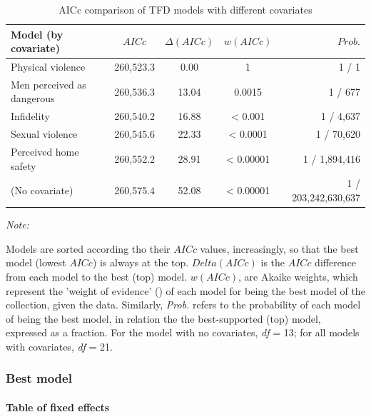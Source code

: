 \documentclass[
  bookmarksnumbered]{article}
\begin{document}
\begin{table}[H]
\centering
\caption{\label{tab:comp-m2}AICc comparison of TFD models with different covariates}
\centering
\begin{threeparttable}
\begin{tabular}[t]{lcccr}
\toprule
Model (by covariate) & $AICc$ & $\Delta(AICc)$ & $w(AICc)$ & $Prob.$\\
\midrule
Physical violence & 260,523.3 & 0.00 & 1 & 1 / 1\\
Men perceived as dangerous & 260,536.3 & 13.04 & 0.0015 & 1 / 677\\
Infidelity & 260,540.2 & 16.88 & < 0.001 & 1 / 4,637\\
Sexual violence & 260,545.6 & 22.33 & < 0.0001 & 1 / 70,620\\
Perceived home safety & 260,552.2 & 28.91 & < 0.00001 & 1 / 1,894,416\\
(No covariate) & 260,575.4 & 52.08 & < 0.00001 & 1 / 203,242,630,637\\
\bottomrule
\end{tabular}
\begin{tablenotes}[para]
\item \textit{Note: } 
\item Models are sorted according tho their $AICc$ values, increasingly, 
             so that the best model (lowest $AICc$) is always at the top. 
             $Delta(AICc)$ is the $AICc$ difference from each model to the best (top) model. 
             $w(AICc)$, are Akaike weights, which represent the 'weight of evidence'
             (\cite{portetPrimerModelSelection2020}) of each model for being the best model 
             of the collection, given the data. 
             Similarly, \textit{Prob.} refers to the probability of each model of being the 
             best model, in relation the the best-supported (top) model, expressed as a 
             fraction. For the model with no covariates, \textit{df} = 13; for all models 
             with covariates, \textit{df} = 21.
\end{tablenotes}
\end{threeparttable}
\end{table}

\subsubsection{Best model}\label{best-model-1}

\paragraph{Table of fixed effects}\label{table-of-fixed-effects-5}
\end{document}
